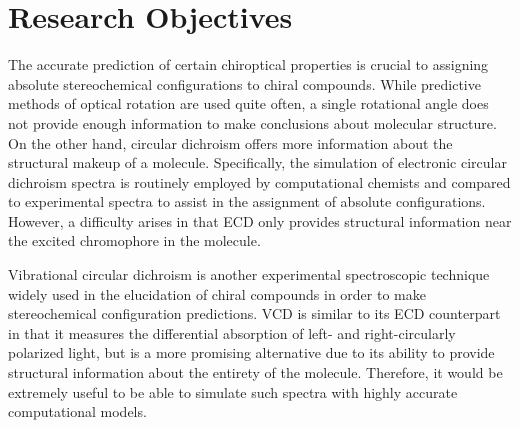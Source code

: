 
\section{Research Objectives}
The accurate prediction of certain chiroptical properties is crucial to assigning absolute stereochemical configurations to chiral compounds. While predictive methods of optical rotation are used quite often, a single rotational angle does not provide enough information to make conclusions about molecular structure. On the other hand, circular dichroism offers more information about the structural makeup of a molecule. Specifically, the simulation of electronic circular dichroism spectra is routinely employed by computational chemists and compared to experimental spectra to assist in the assignment of absolute configurations. However, a difficulty arises in that ECD only provides structural information near the excited chromophore in the molecule. 

    Vibrational circular dichroism\cite{Stephens1985} is another experimental spectroscopic technique widely used in the elucidation of chiral compounds in order to make stereochemical configuration predictions. VCD is similar to its ECD counterpart in that it measures the differential absorption of left- and right-circularly polarized light, but is a more promising alternative due to its ability to provide structural information about the entirety of the molecule. Therefore, it would be extremely useful to be able to simulate such spectra with highly accurate computational models. 

